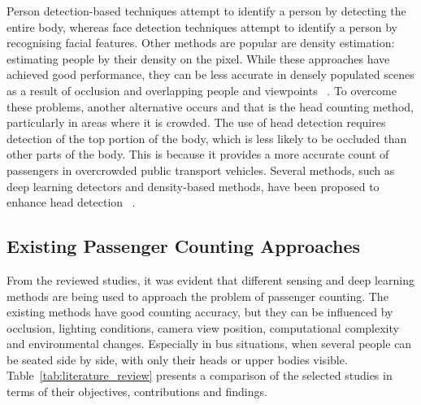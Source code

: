 Person detection-based techniques attempt to identify a person by detecting the entire body, whereas face detection techniques attempt to identify a person by recognising facial features. Other methods are popular are density estimation: estimating people by their density on the pixel. While these approaches have achieved good performance, they can be less accurate in densely populated scenes as a result of occlusion and overlapping people and viewpoints ~\cite{Hsu2020}. To overcome these problems, another alternative occurs and that is the head counting method, particularly in areas where it is crowded. The use of head detection requires detection of the top portion of the body, which is less likely to be occluded than other parts of the body. This is because it provides a more accurate count of passengers in overcrowded public transport vehicles. Several methods, such as deep learning detectors and density-based methods, have been proposed to enhance head detection ~\cite{Claire2021}. 

\subsection{Existing Passenger Counting Approaches}

From the reviewed studies, it was evident that different sensing and deep learning methods are being used to approach the problem of passenger counting. The existing methods have good counting accuracy, but they can be influenced by occlusion, lighting conditions, camera view position, computational complexity and environmental changes. Especially in bus situations, when several people can be seated side by side, with only their heads or upper bodies visible. Table~\ref{tab:literature_review} presents a comparison of the selected studies in terms of their objectives, contributions and findings.


